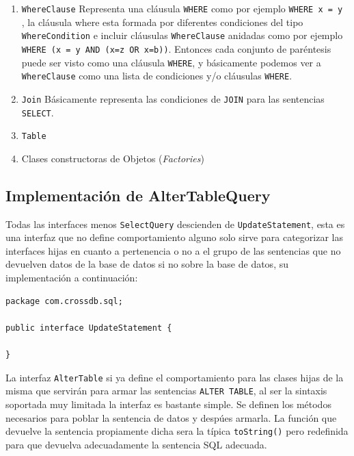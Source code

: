 \begin{enumerate}
\item \verb=WhereClause=  Representa una cláusula \verb=WHERE= como por ejemplo \verb|WHERE x = y | , la cláusula where esta formada por diferentes condiciones del tipo \verb=WhereCondition= e incluir cláusulas \verb=WhereClause= anidadas como por ejemplo \verb|WHERE (x = y AND (x=z OR x=b))|. Entonces cada conjunto de paréntesis puede ser visto como una cláusula \verb=WHERE=, y básicamente podemos ver a \verb=WhereClause= como una lista de condiciones y/o cláusulas \verb=WHERE=.
\item \verb=Join= Básicamente representa las condiciones de \verb=JOIN= para las sentencias \verb=SELECT=.

\item \verb=Table=

\item Clases constructoras de Objetos (\textit{Factories})

\end{enumerate}


\subsection{Implementación de AlterTableQuery}
Todas las interfaces menos \verb=SelectQuery= descienden de \verb=UpdateStatement=, esta es una interfaz que no define comportamiento alguno solo sirve para categorizar las interfaces hijas en cuanto a pertenencia o no a el grupo de las sentencias que no devuelven datos de la base de datos si no sobre la base de datos, su implementación a continuación:

\begin{lstlisting}[title=interfaz UpdateStatement]
package com.crossdb.sql;

public interface UpdateStatement {

}
\end{lstlisting}

La interfaz \verb=AlterTable= si ya define el comportamiento para las clases hijas de la misma que servirán para armar las sentencias \verb=ALTER TABLE=, al ser la sintaxis soportada muy limitada la interfaz es bastante simple. Se definen los métodos necesarios para poblar la sentencia de datos y despúes armarla. La función que devuelve la sentencia propiamente dicha sera la típica \verb=toString()= pero redefinida para que devuelva adecuadamente la sentencia SQL adecuada. 

